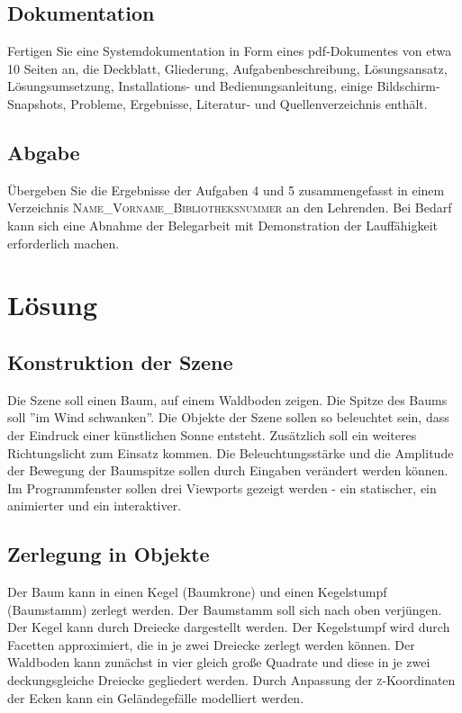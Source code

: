 \documentclass{scrartcl}
\begin{document}
\subsection{Dokumentation}
Fertigen Sie eine Systemdokumentation in Form eines pdf-Dokumentes von
etwa 10 Seiten an, die Deckblatt, Gliederung, Aufgabenbeschreibung, Lösungsansatz,
Lösungsumsetzung, Installations- und Bedienungsanleitung, einige Bildschirm-Snapshots,
Probleme, Ergebnisse, Literatur- und Quellenverzeichnis enthält.

\subsection{Abgabe}
Übergeben Sie die Ergebnisse der Aufgaben 4 und 5 zusammengefasst in einem
Verzeichnis \textsc{Name\_Vorname\_Bibliotheksnummer} an den Lehrenden. Bei Bedarf kann sich
eine Abnahme der Belegarbeit mit Demonstration der Lauffähigkeit erforderlich machen.


\section{Lösung}

\subsection{Konstruktion der Szene}

Die Szene soll einen Baum, auf einem Waldboden zeigen. Die Spitze des Baums soll ''im Wind schwanken''.
Die Objekte der Szene sollen so beleuchtet sein, dass der Eindruck einer künstlichen Sonne entsteht. 
Zusätzlich soll ein weiteres Richtungslicht zum Einsatz kommen. 
Die Beleuchtungsstärke und die Amplitude der Bewegung der Baumspitze sollen durch Eingaben verändert werden können.
Im Programmfenster sollen drei Viewports gezeigt werden - ein statischer, ein animierter und ein interaktiver.

\subsection{Zerlegung in Objekte}

Der Baum kann in einen Kegel (Baumkrone) und einen Kegelstumpf (Baumstamm) zerlegt werden.
Der Baumstamm soll sich nach oben verjüngen.
Der Kegel kann durch Dreiecke dargestellt werden.
Der Kegelstumpf wird durch Facetten approximiert, die in je zwei Dreiecke zerlegt werden können.
Der Waldboden kann zunächst in vier gleich große Quadrate und diese in je zwei deckungsgleiche Dreiecke gegliedert werden.
Durch Anpassung der \textsc{z}-Koordinaten der Ecken kann ein Geländegefälle modelliert werden.
\end{document}
